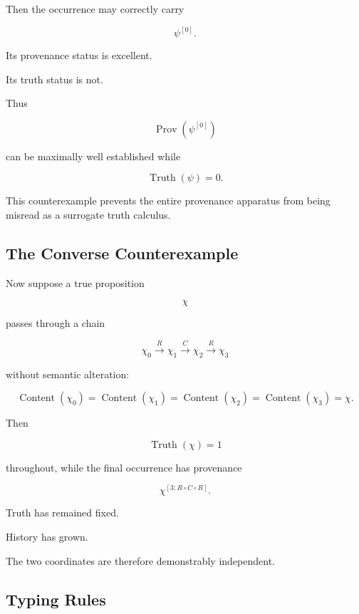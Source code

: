 \documentclass[
  11pt,
  a4paper,
  DIV=12,
  BCOR=0mm,
  parskip=half-
]{scrartcl}
\newcommand{\Truth}{\operatorname{Truth}}
\newcommand{\Prov}{\operatorname{Prov}}
\newcommand{\Content}{\operatorname{Content}}
\theoremstyle{definition}
\theoremstyle{plain}
\theoremstyle{remark}
\begin{document}
Then the occurrence may correctly carry

\[
  \psi^{[0]}.
\]

Its provenance status is excellent.

Its truth status is not.

Thus

\[
  \Prov(\psi^{[0]})
\]

can be maximally well established while

\[
  \Truth(\psi)=0.
\]

This counterexample prevents the entire provenance apparatus from being
misread as a surrogate truth calculus.


\subsection{The Converse Counterexample}
\label{app:true-degraded-provenance}

Now suppose a true proposition

\[
  \chi
\]

passes through a chain

\[
  \chi_0
  \xrightarrow{R}
  \chi_1
  \xrightarrow{C}
  \chi_2
  \xrightarrow{R}
  \chi_3
\]

without semantic alteration:

\[
  \Content(\chi_0)
  =
  \Content(\chi_1)
  =
  \Content(\chi_2)
  =
  \Content(\chi_3)
  =
  \chi.
\]

Then

\[
  \Truth(\chi)=1
\]

throughout, while the final occurrence has provenance

\[
  \chi^{[3:R\circ C\circ R]}.
\]

Truth has remained fixed.

History has grown.

The two coordinates are therefore demonstrably independent.


\subsection{Typing Rules}
\label{app:provenance-type-system}
\end{document}

